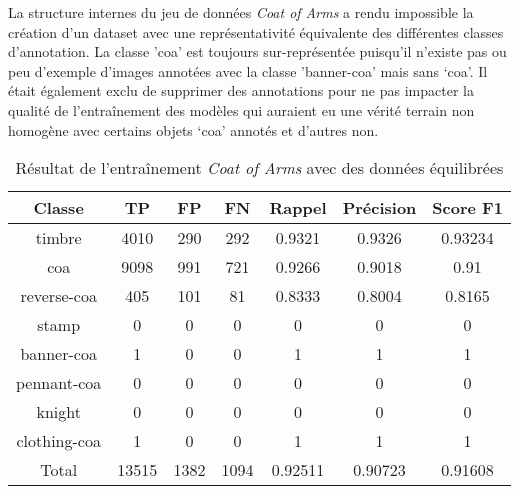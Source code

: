\documentclass[12pt,twoside]{book}
\begin{document}
La structure internes du jeu de données \textit{Coat of Arms} a rendu impossible la création d’un dataset avec une représentativité équivalente des différentes classes d’annotation. La classe 'coa' est toujours sur-représentée puisqu'il n'existe pas ou peu d'exemple d'images annotées avec la classe 'banner-coa' mais sans ‘coa’. Il était également exclu de supprimer des annotations pour ne pas impacter la qualité de l'entraînement des modèles qui auraient eu une vérité terrain non homogène avec certains objets ‘coa’ annotés et d'autres non.

\begin{table}[ht]
    \centering
    \begin{tabular}{|c|c|c|c|c|c|c|}
    \hline
    \textbf{Classe} & \textbf{TP} & \textbf{FP} & \textbf{FN} & \textbf{Rappel} & \textbf{Précision} & \textbf{Score F1} \\
    \hline
    timbre & 4010 & 290 & 292 & 0.9321 & 0.9326 & 0.93234 \\ 
    \hline
    coa & 9098 & 991 & 721 & 0.9266 & 0.9018 & 0.91 \\ 
    \hline
    reverse-coa & 405 & 101 & 81 & 0.8333 & 0.8004 & 0.8165 \\ 
    \hline
    stamp & 0 & 0 & 0 & 0 & 0 & 0 \\ 
    \hline
    banner-coa & 1 & 0 & 0 & 1 & 1 & 1 \\ 
    \hline
    pennant-coa & 0 & 0 & 0 & 0 & 0 & 0 \\ 
    \hline
    knight & 0 & 0 & 0 & 0 & 0 & 0 \\ 
    \hline
    clothing-coa & 1 & 0 & 0 & 1 & 1 & 1 \\ 
    \hline
    Total & 13515 & 1382 & 1094 & 0.92511 & 0.90723 & 0.91608 \\
    \hline
    \end{tabular}
    \vspace{0.5cm}  %
    \caption{Résultat de l'entraînement \textit{Coat of Arms} avec des données équilibrées}
\end{table}
\end{document}
